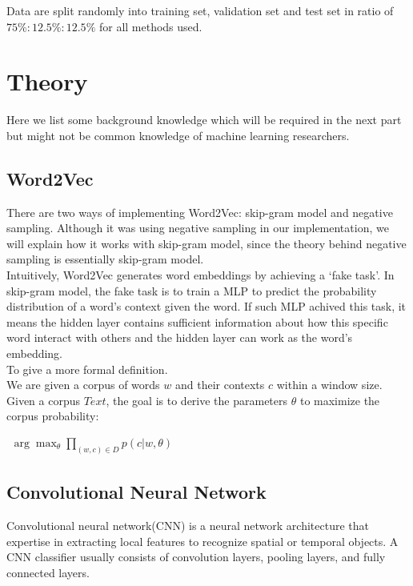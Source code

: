 \documentclass[12pt,openany,a4paper]{book}
\begin{document}
  Data are split randomly into training set, validation set and test set in ratio of $75\%:12.5\%:12.5\%$ for all methods used.
  

\chapter{Theory}

Here we list some background knowledge which will be required in the next part but might not be common knowledge of machine learning researchers.
\section{Word2Vec}
There are two ways of implementing Word2Vec\cite{mikolov2013efficient}: skip-gram model and negative sampling. Although it was using negative sampling in our implementation, we will explain how it works with skip-gram model, since the theory behind negative sampling is essentially skip-gram model.\\

Intuitively, Word2Vec generates word embeddings by achieving a `fake task'. In skip-gram model, the fake task is to train a MLP to predict the probability distribution of a word's context given the word. If such MLP achived this task, it means the hidden layer contains sufficient information about how this specific word interact with others and the hidden layer can work as the word's embedding.\\

To give a more formal definition. \\

We are given a corpus of words $w$ and their contexts $c$ within a window size. Given a corpus $Text$, the goal is to derive the parameters $\theta$ to maximize the corpus probability\cite{goldberg2014word2vec}:\\
\begin{center}
$\begin{aligned}
\arg\max_{\theta}\prod_{(w,c)\in D}p(c|w,\theta)
\end{aligned}$
\end{center}


\section{Convolutional Neural Network}

Convolutional neural network(CNN) is a neural network architecture that expertise in extracting local features to recognize spatial or temporal objects\cite{lecun1995convolutional}. A CNN classifier usually consists of convolution layers, pooling layers, and fully connected layers. \\
\end{document}
